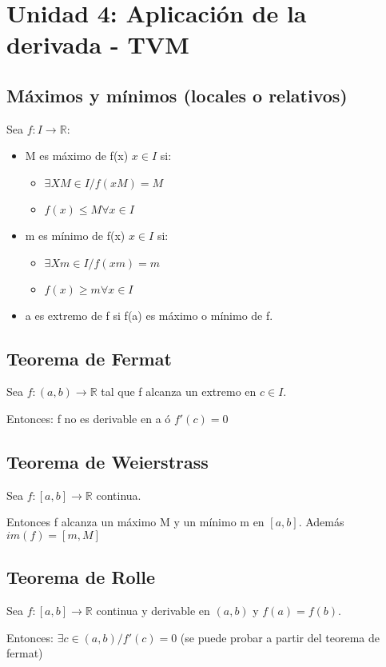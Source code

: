 \documentclass{report}
\begin{document}
\chapter{Unidad 4: Aplicación de la derivada - TVM}
	\section{Máximos y mínimos (locales o relativos)}
		Sea $f:I\to \mathbb{R}$:
		
		\begin{itemize}
			\item M es máximo de f(x) $x \in I$ si:
				\begin{itemize}
					\item $\exists XM \in I /f(xM) = M$
					\item $f(x) \leq M \forall x \in I$
				\end{itemize}
			\item m es mínimo de f(x) $x \in I$ si:
				\begin{itemize}
					\item $\exists Xm \in I /f(xm) = m$
					\item $f(x) \geq m \forall x \in I$
				\end{itemize}
			\item a es extremo de f si f(a) es máximo o mínimo de f.
		\end{itemize}
		
	\section{Teorema de Fermat}
		Sea $f:(a,b)\to \mathbb{R}$ tal que f alcanza un extremo en $c\in I$.
		
		Entonces: f no es derivable en a ó $f'(c)=0$
		
	\section{Teorema de Weierstrass}
		Sea $f:[a,b]\to \mathbb{R}$ continua. 
		
		Entonces f alcanza un máximo M y un mínimo m en $[a,b]$. Además $im(f)=[m,M]$
		
	\section{Teorema de Rolle}
		Sea $f:[a,b]\to \mathbb{R}$ continua y derivable en $(a,b)$ y $f(a)=f(b)$.
		
		Entonces: $\exists c \in (a,b) / f'(c)=0$ (se puede probar a partir del teorema de fermat)
		
\end{document}
